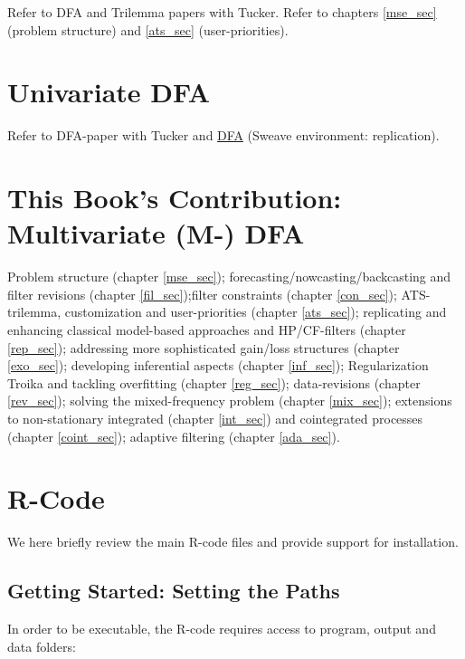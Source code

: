 \documentclass[a4paper]{book}
\begin{document}
Refer to DFA and Trilemma papers with Tucker. Refer to chapters \ref{mse_sec} (problem structure) and \ref{ats_sec} (user-priorities). 

\section{Univariate DFA}

Refer to DFA-paper with Tucker and \href{http://blog.zhaw.ch/sef/files/2014/10/DFA.pdf}{DFA} (Sweave environment: replication). 


\section{This Book's Contribution: Multivariate (M-) DFA}

Problem structure (chapter \ref{mse_sec}); forecasting/nowcasting/backcasting and filter revisions (chapter \ref{fil_sec});filter constraints (chapter \ref{con_sec}); ATS-trilemma, customization and user-priorities (chapter \ref{ats_sec}); replicating and enhancing classical model-based approaches and HP/CF-filters (chapter \ref{rep_sec}); addressing more sophisticated gain/loss structures (chapter \ref{exo_sec}); developing inferential aspects (chapter \ref{inf_sec}); Regularization Troika and tackling overfitting (chapter \ref{reg_sec}); data-revisions (chapter \ref{rev_sec}); solving the mixed-frequency problem (chapter \ref{mix_sec}); extensions to non-stationary integrated (chapter \ref{int_sec}) and cointegrated processes (chapter \ref{coint_sec}); adaptive filtering (chapter \ref{ada_sec}).




\section{R-Code}

We here briefly review the main R-code files and provide support for installation.

\subsection{Getting Started: Setting the Paths}

In order to be executable, the R-code requires access to program, output and data folders:
\end{document}
